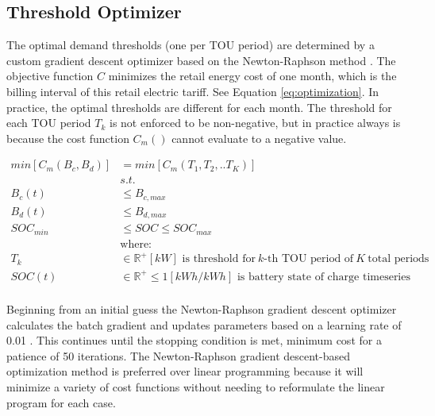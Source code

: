 \documentclass[journal,article,submit,pdftex,moreauthors]{Definitions/mdpi}
\begin{document}
\subsection{Threshold Optimizer}\label{threshold-optimizer}%

The optimal demand thresholds (one per TOU period) are determined by a custom gradient descent optimizer based on the Newton-Raphson method \cite{Truong2019}. The objective function \(C\) minimizes the retail energy cost of one month, which is the billing interval of this retail electric tariff. See Equation \ref{eq:optimization}. In practice, the optimal thresholds are different for each month. The threshold for each TOU period \(T_k\) is not enforced to be non-negative, but in practice always is because the cost function \(C_m()\) cannot evaluate to a negative value.

\begin{equation}
  \label{eq:optimization}
  \begin{split}
    min[C_m(B_c,B_d)] & = min[C_m(T_1,T_2,..T_K)]                                                                          \\
                      & s.t.                                                                                               \\
    B_c(t)            & \le B_{c,max}                                                                                      \\
    B_d(t)            & \le B_{d,max}                                                                                      \\
    SOC_{min}         & \le SOC \le SOC_{max}                                                                              \\
                      & \text{where:}                                                                                      \\
    T_k               & \in \mathbb{R}^+ [kW] \text{ is threshold for}\ k\text{-th TOU period of}\ K\ \text{total periods} \\
    SOC(t)            & \in \mathbb{R}^+ \le 1 [kWh/kWh]  \text{ is battery state of charge timeseries}\                   \\
  \end{split}
\end{equation}

Beginning from an initial guess the Newton-Raphson gradient descent optimizer calculates the batch gradient and updates parameters based on a learning rate of 0.01 \cite{Truong2019}. This continues until the stopping condition is met, minimum cost for a patience of 50 iterations. The Newton-Raphson gradient descent-based optimization method is preferred over linear programming because it will minimize a variety of cost functions without needing to reformulate the linear program for each case.
\end{document}
